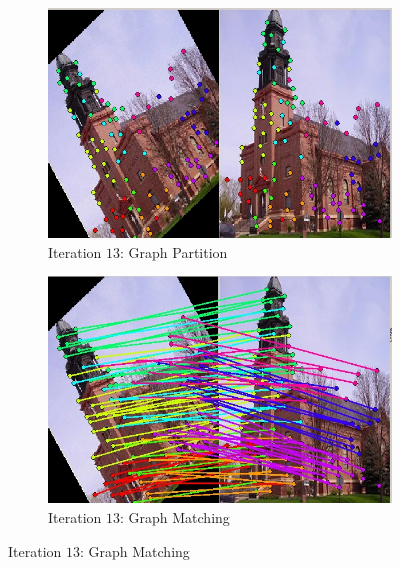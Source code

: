\documentclass[
	fontsize=12pt,
	paper=a4,
	twoside=false,
	numbers=noenddot,
	plainheadsepline,
	toc=listof,
	toc=bibliography
]{scrartcl}
\begin{document}
	\begin{figure}[h] 
	\begin{subfigure}[b]{0.5\textwidth}
		\centering
		\includegraphics[scale=0.35]{fig/method2/test_imagetrafo3/partition_it13.jpg} 
		\caption{Iteration $13$: Graph Partition} 
	\end{subfigure}%
	\begin{subfigure}[b]{0.5\textwidth}
		\centering
		\includegraphics[scale=0.35]{fig/method2/test_imagetrafo3/LL_it13.jpg} 
		\caption{Iteration $13$: Graph Matching} 
	\end{subfigure} 
	

\end{figure}
\end{document}
